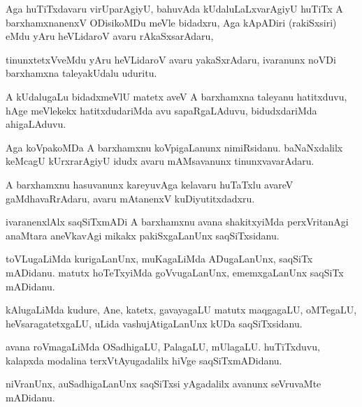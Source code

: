 \documentclass{article}
\begin{document}
\begin{mn}
Aga huTiTxdavaru virUparAgiyU, bahuvAda kUdaluLaLxvarAgiyU huTiTx A
barxhamxnanenxV ODisikoMDu meVle bidadxru, Aga kApADiri (rakiSxsiri)
eMdu yAru heVLidaroV avaru rAkaSxsarAdaru,
\end{mn}

\begin{mn}
tinunxtetxVveMdu yAru heVLidaroV avaru yakaSxrAdaru, ivaranunx noVDi
barxhamxna taleyakUdalu uduritu.
\end{mn}

\begin{mn}
A kUdalugaLu bidadxmeVlU matetx aveV A barxhamxna taleyanu hatitxduvu,
hAge meVlekekx hatitxdudariMda avu sapaRgaLAduvu, bidudxdariMda ahigaLAduvu.
\end{mn}

\begin{mn}%
Aga koVpakoMDa A barxhamxnu koVpigaLanunx nimiRsidanu. baNaNxdalilx
keMcagU kUrxrarAgiyU idudx avaru mAMsavanunx tinunxvavarAdaru.
\end{mn}

\begin{mn}
A barxhamxnu hasuvanunx kareyuvAga kelavaru huTaTxlu avareV
gaMdhavaRrAdaru, avaru mAtanenxV kuDiyutitxdadxru.
\end{mn}

\begin{mn}
ivaranenxlAlx saqSiTxmADi A barxhamxnu avana shakitxyiMda
perxVritanAgi anaMtara aneVkavAgi mikakx pakiSxgaLanUnx saqSiTxsidanu.
\end{mn}

\begin{mn}
toVLugaLiMda kurigaLanUnx, muKagaLiMda ADugaLanUnx, saqSiTx
mADidanu. matutx hoTeTxyiMda goVvugaLanUnx, ememxgaLanUnx saqSiTx mADidanu.
\end{mn}

\begin{mn}
kAlugaLiMda kudure, Ane, katetx, gavayagaLU matutx maqgagaLU,
oMTegaLU, heVsaragatetxgaLU, uLida vashujAtigaLanUnx kUDa saqSiTxsidanu.
\end{mn}

\begin{mn}%
avana roVmagaLiMda OSadhigaLU, PalagaLU, mUlagaLU. huTiTxduvu,
kalapxda modalina terxVtAyugadalilx hiVge saqSiTxmADidanu.
\end{mn}

\begin{mn}
niVranUnx, auSadhigaLanUnx saqSiTxsi yAgadalilx avanunx seVruvaMte mADidanu.
\end{mn}
\end{document}
